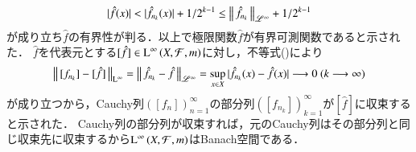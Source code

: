 \begin{qst}
\begin{prf}
\begin{description}
\begin{align}
				|\hat{f}(x)| < |\hat{f}_{n_k}(x)| + 1/2^{k-1} \leq \left\|\, \hat{f}_{n_k}\, \right\|_{\mathscr{L}^\infty} + 1/2^{k-1}
			\end{align}
			が成り立ち$\hat{f}$の有界性が判る．以上で極限関数$\hat{f}$が有界可測関数であると示された．
			$\hat{f}$を代表元とする$[\hat{f}] \in \operatorname{L}^{\infty} \left(X,\mathcal{F},m\right)$に対し，不等式()により
			\begin{align}
				\left\|\, [f_{n_k}] - [\hat{f}]\, \right\|_{\mathrm{L}^\infty} = \left\|\, \hat{f}_{n_k} - \hat{f}\, \right\|_{\mathscr{L}^\infty} 
				= \operatorname*{sup}_{x \in X} |\hat{f}_{n_k}(x) - \hat{f}(x)|
				\longrightarrow 0 \ (k \longrightarrow \infty)
			\end{align}
			が成り立つから，Cauchy列$\left( [f_{n}] \right)_{n=1}^{\infty}$の部分列$\left( [f_{n_k}] \right)_{k=1}^{\infty}$が$[\hat{f}]$に収束すると示された．
			Cauchy列の部分列が収束すれば，元のCauchy列はその部分列と同じ収束先に収束するから$\operatorname{L}^{\infty} \left(X,\mathcal{F},m\right)$はBanach空間である．
			

\end{description}
\end{prf}
\end{qst}
